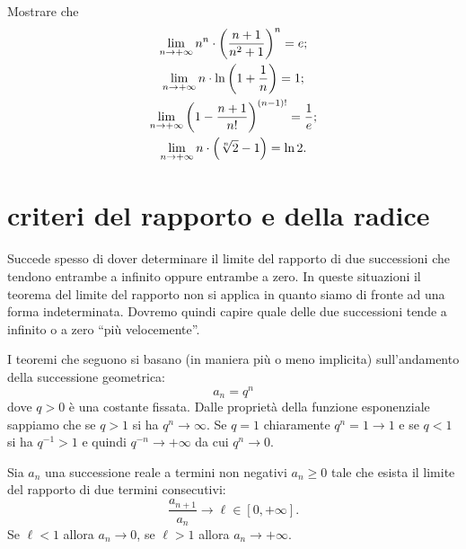 \begin{exercise}
Mostrare che
\begin{gather*}
  \lim_{n\to+\infty} n^n\cdot {\left( \frac{n+1}{n^2+1} \right)}^n = e; \\
  \lim_{n\to+\infty} n\cdot \ln{\left( 1 + \frac 1 n \right)} = 1; \\
  \lim_{n\to+\infty} {\left( 1-\frac{n+1}{n!} \right)}^{(n-1)!} = \frac 1 e; \\
  \lim_{n\to+\infty} n \cdot {\left( \sqrt[n]{2}-1 \right)} = \ln 2.
\end{gather*}
\end{exercise}

\section{criteri del rapporto e della radice}

Succede spesso di dover determinare il limite
del rapporto di due successioni che tendono entrambe a infinito
oppure entrambe a zero.
In queste situazioni il teorema del limite del rapporto non
si applica in quanto siamo di fronte ad una forma indeterminata.
Dovremo quindi capire quale delle due successioni
tende a infinito o a zero ``più velocemente''.

I teoremi che seguono si basano (in maniera più o meno implicita)
sull'andamento della successione geometrica:
\[
  a_n = q^n
\]
dove $q>0$ è una costante fissata.
Dalle proprietà della funzione esponenziale 
sappiamo che se $q>1$ si ha $q^n\to \infty$.
Se $q=1$ chiaramente $q^n=1\to 1$
e se $q<1$ si ha $q^{-1}>1$ e quindi $q^{-n} \to +\infty$
da cui $q^n \to 0$.

\begin{theorem}
\label{th:criterio_rapporto}
  Sia $a_n$ una successione reale a termini non negativi
  $a_n \ge 0$ tale che esista il limite del rapporto di due termini consecutivi:
  \[
     \frac{a_{n+1}}{a_n} \to \ell \in [0,+\infty].
  \]
  Se $\ell < 1$ allora $a_n \to 0$, se $\ell >1$ allora $a_n \to +\infty$.
\end{theorem}
%
%
%

